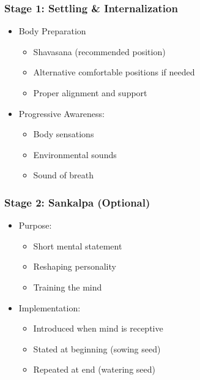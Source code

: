 \begin{frame}[fragile]\frametitle{Stage 1: Settling \& Internalization}
    \begin{itemize}
        \item Body Preparation
            \begin{itemize}
                \item Shavasana (recommended position)
                \item Alternative comfortable positions if needed
                \item Proper alignment and support
            \end{itemize}
        \item Progressive Awareness:
            \begin{itemize}
                \item Body sensations
                \item Environmental sounds
                \item Sound of breath
            \end{itemize}
    \end{itemize}
\end{frame}

\begin{frame}[fragile]\frametitle{Stage 2: Sankalpa (Optional)}
    \begin{itemize}
        \item Purpose:
            \begin{itemize}
                \item Short mental statement
                \item Reshaping personality
                \item Training the mind
            \end{itemize}
        \item Implementation:
            \begin{itemize}
                \item Introduced when mind is receptive
                \item Stated at beginning (sowing seed)
                \item Repeated at end (watering seed)
            \end{itemize}
    \end{itemize}
\end{frame}

